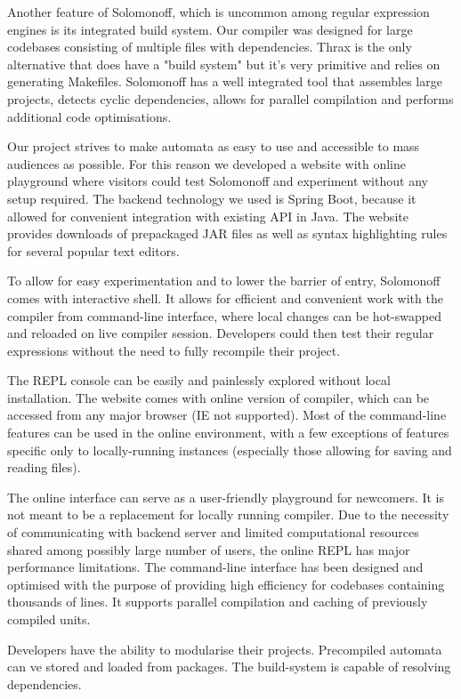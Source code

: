 Another feature of Solomonoff, which is uncommon among regular expression engines is its integrated build system. Our compiler was designed for large codebases consisting of multiple files with dependencies. Thrax is the only alternative that does have a "build system" but it's very primitive and relies on generating Makefiles. Solomonoff has a well integrated tool that assembles large projects, detects cyclic dependencies, allows for parallel compilation and performs additional code optimisations. 


Our project strives to make automata as easy to use and accessible to mass audiences as possible. For this reason we developed a website with online playground where visitors could test Solomonoff and experiment without any setup required. The backend technology we used is Spring Boot, because it allowed for convenient integration with existing API in Java. The website provides downloads of prepackaged JAR files as well as syntax highlighting rules for several popular text editors. 



To allow for easy experimentation and to lower the barrier of entry, Solomonoff comes with interactive shell. It allows for efficient and convenient work with the compiler from command-line interface, where local changes can be hot-swapped and reloaded on live compiler session. Developers could then test their regular expressions without the need to fully recompile their project. 

The REPL console can be easily and painlessly explored without local installation. The website comes with online version of compiler, which can be accessed from any major browser (IE not supported). Most of the command-line features can be used in the online environment, with a few exceptions of features specific only to locally-running instances (especially those allowing for saving and reading files). 

The online interface can serve as a user-friendly playground for newcomers. It is not meant to be a replacement for locally running compiler. Due to the necessity of communicating with backend server and limited computational resources shared among possibly large number of users, the online REPL has major performance limitations. The command-line interface has been designed and optimised with the purpose of providing high efficiency for codebases containing thousands of lines. It supports parallel compilation and caching of previously compiled units. 

Developers have the ability to modularise their projects. Precompiled automata can ve stored and loaded from packages. The build-system is capable of resolving dependencies.

